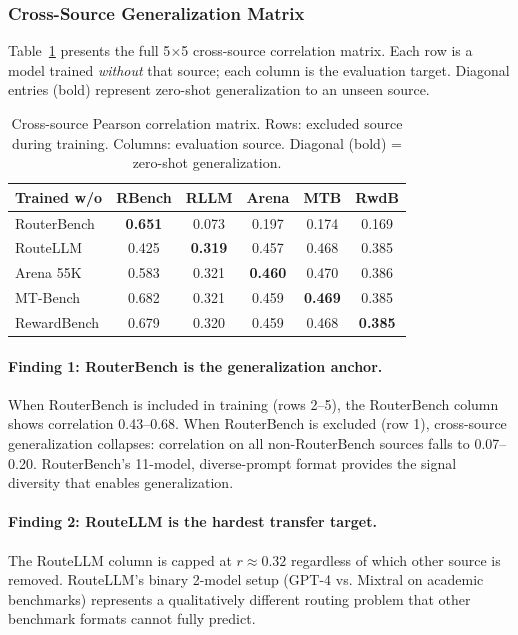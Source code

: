 \subsubsection{Cross-Source Generalization Matrix}

Table~\ref{tab:cross_source} presents the full 5$\times$5 cross-source correlation matrix. Each row is a model trained \emph{without} that source; each column is the evaluation target. Diagonal entries (bold) represent zero-shot generalization to an unseen source.

\begin{table}[h]
\centering
\caption{Cross-source Pearson correlation matrix. Rows: excluded source during training. Columns: evaluation source. Diagonal (bold) = zero-shot generalization.}
\label{tab:cross_source}
\small
\begin{tabular}{lccccc}
\toprule
\textbf{Trained w/o} & \textbf{RBench} & \textbf{RLLM} & \textbf{Arena} & \textbf{MTB} & \textbf{RwdB} \\
\midrule
RouterBench & \textbf{0.651} & 0.073 & 0.197 & 0.174 & 0.169 \\
RouteLLM & 0.425 & \textbf{0.319} & 0.457 & 0.468 & 0.385 \\
Arena 55K & 0.583 & 0.321 & \textbf{0.460} & 0.470 & 0.386 \\
MT-Bench & 0.682 & 0.321 & 0.459 & \textbf{0.469} & 0.385 \\
RewardBench & 0.679 & 0.320 & 0.459 & 0.468 & \textbf{0.385} \\
\bottomrule
\end{tabular}
\end{table}

\paragraph{Finding 1: RouterBench is the generalization anchor.}
When RouterBench is included in training (rows 2--5), the RouterBench column shows correlation 0.43--0.68. When RouterBench is excluded (row 1), cross-source generalization collapses: correlation on all non-RouterBench sources falls to 0.07--0.20. RouterBench's 11-model, diverse-prompt format provides the signal diversity that enables generalization.

\paragraph{Finding 2: RouteLLM is the hardest transfer target.}
The RouteLLM column is capped at $r \approx 0.32$ regardless of which other source is removed. RouteLLM's binary 2-model setup (GPT-4 vs. Mixtral on academic benchmarks) represents a qualitatively different routing problem that other benchmark formats cannot fully predict.


